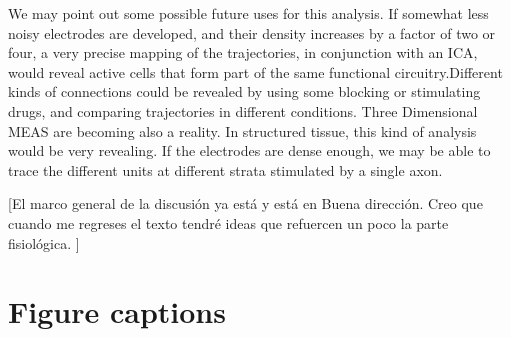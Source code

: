 \documentclass[letterpaper,12pts]{article}
\newcommand{\romment}[1]{{\color{blue} [#1]}}
\begin{document}
We may point out some possible future uses for this analysis. If somewhat less noisy electrodes are developed, and their density increases by a factor of two or four, a very precise mapping of the trajectories, in conjunction with an ICA, would reveal active cells that form part of the same functional circuitry.Different kinds of connections could be revealed by using some blocking or stimulating drugs, and comparing trajectories in different conditions. Three Dimensional MEAS are becoming also a reality. In structured tissue, this kind of analysis would be very revealing. If the electrodes are dense enough, we may be able to trace the different units at different
strata stimulated by a single axon.


\romment{El marco general de la discusión ya está y está en Buena dirección. Creo que cuando me regreses el texto tendré ideas que refuercen un poco la parte fisiológica.
}




 

\section*{Figure captions}




%
\end{document}
